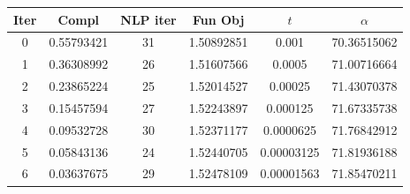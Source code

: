 \begin{tabular}{c c c c c c}
\toprule
Iter & Compl & NLP iter & Fun Obj & $t$ & $\alpha$ \\
\midrule
0 & 0.55793421 & 31 & 1.50892851 & 0.001 & 70.36515062 \\
1 & 0.36308992 & 26 & 1.51607566 & 0.0005 & 71.00716664 \\
2 & 0.23865224 & 25 & 1.52014527 & 0.00025 & 71.43070378 \\
3 & 0.15457594 & 27 & 1.52243897 & 0.000125 & 71.67335738 \\
4 & 0.09532728 & 30 & 1.52371177 & 0.0000625 & 71.76842912 \\
5 & 0.05843136 & 24 & 1.52440705 & 0.00003125 & 71.81936188 \\
6 & 0.03637675 & 29 & 1.52478109 & 0.00001563 & 71.85470211 \\
\bottomrule
\end{tabular}